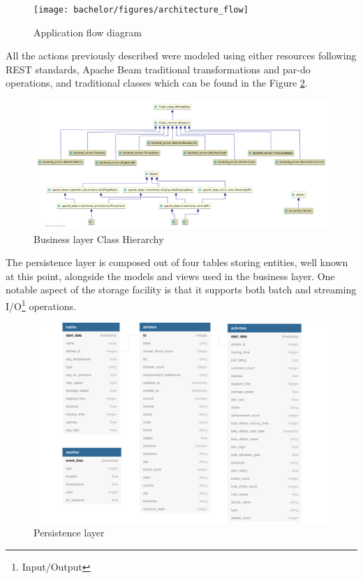 \begin{figure}[!htb]
    \centering
    \texttt{[image: bachelor/figures/architecture\_flow]}
    \caption{Application flow diagram}
    \label{fig:app_flow1997}
\end{figure}

All the actions previously described were modeled using either resources following REST standards, Apache Beam traditional transformations and par-do operations, and traditional classes which can be found in the Figure \ref{fig:backend_classes09}.

\begin{figure}[!htb]
    \centering
    \includegraphics[width = 15.5cm]{figures/backend_cd}
    \caption{Business layer Class Hierarchy}
    \label{fig:backend_classes09}
\end{figure}

The persistence layer is composed out of four tables storing entities, well known at this point, alongside the models and views used in the business layer. One notable aspect of the storage facility is that it supports both batch and streaming I/O\footnote{Input/Output} operations.

\begin{figure}[!htb]
    \centering
    \includegraphics[width = 15.5cm]{figures/dbcd}
    \caption{Persistence layer}
    \label{fig:usecases}
\end{figure}

